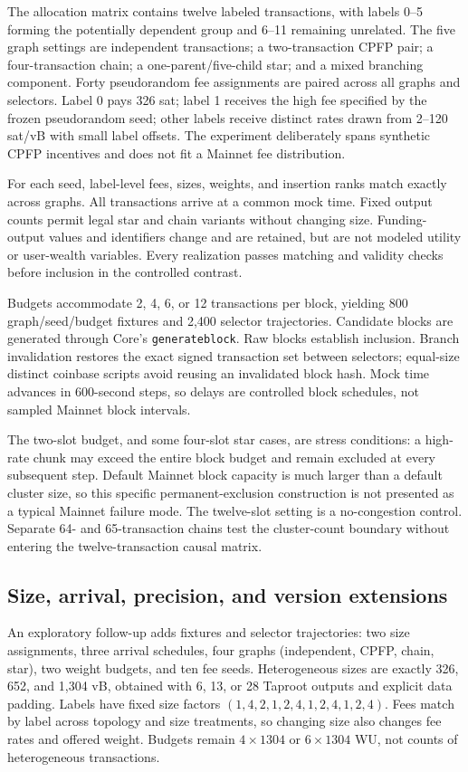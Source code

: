 \documentclass[conference]{IEEEtran}
\begin{document}
The allocation matrix contains twelve labeled transactions, with labels 0--5 forming the potentially dependent group and 6--11 remaining unrelated. The five graph settings are independent transactions; a two-transaction CPFP pair; a four-transaction chain; a one-parent/five-child star; and a mixed branching component. Forty pseudorandom fee assignments are paired across all graphs and selectors. Label 0 pays 326 sat; label 1 receives the high fee specified by the frozen pseudorandom seed; other labels receive distinct rates drawn from 2--120 sat/vB with small label offsets. The experiment deliberately spans synthetic CPFP incentives and does not fit a Mainnet fee distribution.

For each seed, label-level fees, sizes, weights, and insertion ranks match exactly across graphs. All transactions arrive at a common mock time. Fixed output counts permit legal star and chain variants without changing size. Funding-output values and identifiers change and are retained, but are not modeled utility or user-wealth variables. Every realization passes matching and validity checks before inclusion in the controlled contrast.

Budgets accommodate 2, 4, 6, or 12 transactions per block, yielding 800 graph/seed/budget fixtures and 2,400 selector trajectories. Candidate blocks are generated through Core's \texttt{generateblock}. Raw blocks establish inclusion. Branch invalidation restores the exact signed transaction set between selectors; equal-size distinct coinbase scripts avoid reusing an invalidated block hash. Mock time advances in 600-second steps, so delays are controlled block schedules, not sampled Mainnet block intervals.

The two-slot budget, and some four-slot star cases, are stress conditions: a high-rate chunk may exceed the entire block budget and remain excluded at every subsequent step. Default Mainnet block capacity is much larger than a default cluster size, so this specific permanent-exclusion construction is not presented as a typical Mainnet failure mode. The twelve-slot setting is a no-congestion control. Separate 64- and 65-transaction chains test the cluster-count boundary without entering the twelve-transaction causal matrix.

\subsection{Size, arrival, precision, and version extensions}
An exploratory follow-up adds \ICBCExtFixtures{} fixtures and \ICBCExtTrajectories{} selector trajectories: two size assignments, three arrival schedules, four graphs (independent, CPFP, chain, star), two weight budgets, and ten fee seeds. Heterogeneous sizes are exactly 326, 652, and 1,304 vB, obtained with 6, 13, or 28 Taproot outputs and explicit data padding. Labels have fixed size factors $(1,4,2,1,2,4,1,2,4,1,2,4)$. Fees match by label across topology and size treatments, so changing size also changes fee rates and offered weight. Budgets remain $4\times1304$ or $6\times1304$ WU, not counts of heterogeneous transactions.
\end{document}
